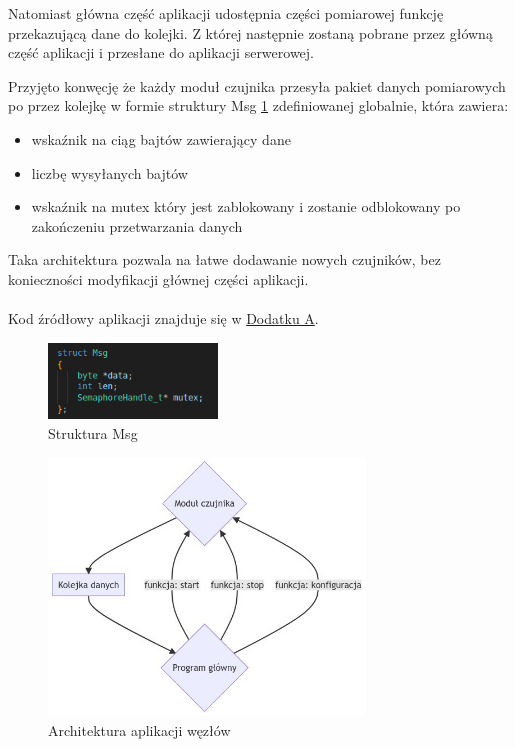 \documentclass[12pt,oneside,a4paper]{book}
\theoremstyle{break}
\begin{document}
Natomiast główna część aplikacji udostępnia części pomiarowej funkcję przekazującą dane do kolejki.
Z której następnie zostaną pobrane przez główną część aplikacji i przesłane do aplikacji serwerowej.
\par Przyjęto konwęcję że każdy moduł czujnika przesyła pakiet danych pomiarowych po przez kolejkę w formie
struktury Msg \ref{rys:uc-msg} zdefiniowanej globalnie, która zawiera:

\begin{itemize}
    \item wskaźnik na ciąg bajtów zawierający dane
    \item liczbę wysyłanych bajtów
    \item wskaźnik na mutex który jest zablokowany i zostanie odblokowany po zakończeniu przetwarzania danych
\end{itemize}

\par Taka architektura pozwala na łatwe dodawanie nowych czujników, bez konieczności modyfikacji głównej części aplikacji.\\
\\Kod źródłowy aplikacji znajduje się w \hyperref[node-coode]{Dodatku A}.


\begin{figure}[H]
    \begin{center}
        \includegraphics[width=0.4\textwidth]{uc-msg}
        \caption{Struktura Msg}
        \label{rys:uc-msg}
    \end{center}
\end{figure}

\begin{figure}[H]
    \begin{center}
        \includegraphics[width=0.75\textwidth]{uc-architecture}
        \caption{Architektura aplikacji węzłów}        
        \label{rys:architektura-aplikacji-węzłów}
    \end{center}
\end{figure}
\end{document}
